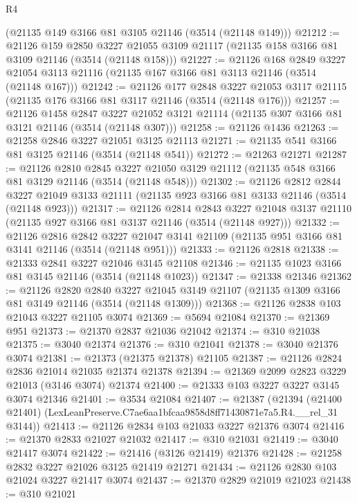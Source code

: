 \begin{lexlean}{R4}
\begin{coremodule}
    (@21135 @149 @3166 @81 @3105 @21146 (@3514 (@21148 @149)))
@21212 := @21126
    @159
    @2850
    @3227
    @21055
    @3109
    @21117
    (@21135 @158 @3166 @81 @3109 @21146 (@3514 (@21148 @158)))
@21227 := @21126
    @168
    @2849
    @3227
    @21054
    @3113
    @21116
    (@21135 @167 @3166 @81 @3113 @21146 (@3514 (@21148 @167)))
@21242 := @21126
    @177
    @2848
    @3227
    @21053
    @3117
    @21115
    (@21135 @176 @3166 @81 @3117 @21146 (@3514 (@21148 @176)))
@21257 := @21126
    @1458
    @2847
    @3227
    @21052
    @3121
    @21114
    (@21135 @307 @3166 @81 @3121 @21146 (@3514 (@21148 @307)))
@21258 := @21126 @1436
@21263 := @21258 @2846 @3227 @21051 @3125 @21113
@21271 := @21135 @541 @3166 @81 @3125 @21146 (@3514 (@21148 @541))
@21272 := @21263 @21271
@21287 := @21126
    @2810
    @2845
    @3227
    @21050
    @3129
    @21112
    (@21135 @548 @3166 @81 @3129 @21146 (@3514 (@21148 @548)))
@21302 := @21126
    @2812
    @2844
    @3227
    @21049
    @3133
    @21111
    (@21135 @923 @3166 @81 @3133 @21146 (@3514 (@21148 @923)))
@21317 := @21126
    @2814
    @2843
    @3227
    @21048
    @3137
    @21110
    (@21135 @927 @3166 @81 @3137 @21146 (@3514 (@21148 @927)))
@21332 := @21126
    @2816
    @2842
    @3227
    @21047
    @3141
    @21109
    (@21135 @951 @3166 @81 @3141 @21146 (@3514 (@21148 @951)))
@21333 := @21126 @2818
@21338 := @21333 @2841 @3227 @21046 @3145 @21108
@21346 := @21135 @1023 @3166 @81 @3145 @21146 (@3514 (@21148 @1023))
@21347 := @21338 @21346
@21362 := @21126
    @2820
    @2840
    @3227
    @21045
    @3149
    @21107
    (@21135 @1309 @3166 @81 @3149 @21146 (@3514 (@21148 @1309)))
@21368 := @21126 @2838 @103 @21043 @3227 @21105 @3074
@21369 := @5694 @21084
@21370 := @21369 @951
@21373 := @21370 @2837 @21036 @21042
@21374 := @310 @21038
@21375 := @3040 @21374
@21376 := @310 @21041
@21378 := @3040 @21376 @3074
@21381 := @21373 (@21375 @21378) @21105
@21387 := @21126 @2824 @2836 @21014 @21035 @21374 @21378
@21394 := @21369 @2099 @2823 @3229 @21013 (@3146 @3074) @21374
@21400 := @21333 @103 @3227 @3227 @3145 @3074 @21346
@21401 := @3534 @21084
@21407 := @21387
    (@21394 (@21400 @21401) (LexLeanPreserve.C7ae6aa1bfcaa9858d8ff71430871e7a5.R4.__rel_31 @3144))
@21413 := @21126 @2834 @103 @21033 @3227 @21376 @3074
@21416 := @21370 @2833 @21027 @21032
@21417 := @310 @21031
@21419 := @3040 @21417 @3074
@21422 := @21416 (@3126 @21419) @21376
@21428 := @21258 @2832 @3227 @21026 @3125 @21419 @21271
@21434 := @21126 @2830 @103 @21024 @3227 @21417 @3074
@21437 := @21370 @2829 @21019 @21023
@21438 := @310 @21021

\end{coremodule}
\end{lexlean}

